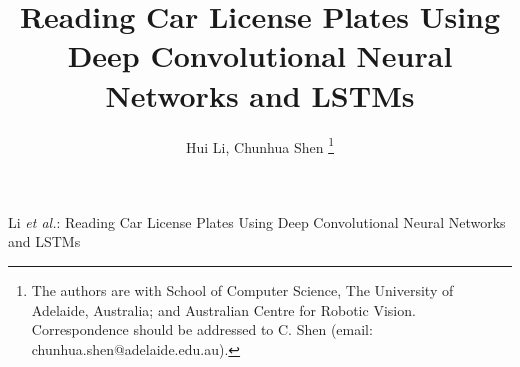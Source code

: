 \documentclass[twocolumn]{svjour3}
\begin{document}
%
\title{Reading Car License Plates
      Using Deep Convolutional Neural Networks and LSTMs}

\author{Hui Li,
        Chunhua Shen
\thanks{
  The authors are with School of Computer Science,
  The University of Adelaide, Australia; and  Australian Centre for Robotic Vision.
  Correspondence should be addressed to C. Shen (email: chunhua.shen@adelaide.edu.au).
}
}

\institute{}



%
{Li \MakeLowercase{\textit{et al.}}:
      Reading Car License Plates
      Using Deep Convolutional Neural Networks and LSTMs
}






\maketitle
\end{document}
